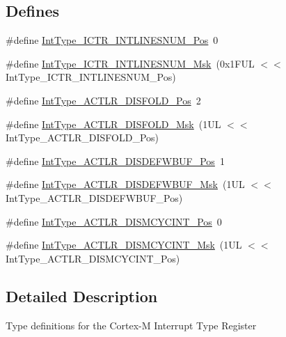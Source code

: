 \subsection*{\-Defines}
\begin{DoxyCompactItemize}
\item 
\#define \hyperlink{group___c_m_s_i_s___interrupt_type_gac80eaf3ce321fd9fb771e0fe260468a5}{\-Int\-Type\-\_\-\-I\-C\-T\-R\-\_\-\-I\-N\-T\-L\-I\-N\-E\-S\-N\-U\-M\-\_\-\-Pos}~0
\item 
\#define \hyperlink{group___c_m_s_i_s___interrupt_type_gaaf30c82ebbf75953fd79f7f4d3696de5}{\-Int\-Type\-\_\-\-I\-C\-T\-R\-\_\-\-I\-N\-T\-L\-I\-N\-E\-S\-N\-U\-M\-\_\-\-Msk}~(0x1\-F\-U\-L $<$$<$ Int\-Type\-\_\-\-I\-C\-T\-R\-\_\-\-I\-N\-T\-L\-I\-N\-E\-S\-N\-U\-M\-\_\-\-Pos)
\item 
\#define \hyperlink{group___c_m_s_i_s___interrupt_type_ga61853c19f3d459914636a4759a1f5306}{\-Int\-Type\-\_\-\-A\-C\-T\-L\-R\-\_\-\-D\-I\-S\-F\-O\-L\-D\-\_\-\-Pos}~2
\item 
\#define \hyperlink{group___c_m_s_i_s___interrupt_type_ga3bb958e0f68490877855c70e62d8e702}{\-Int\-Type\-\_\-\-A\-C\-T\-L\-R\-\_\-\-D\-I\-S\-F\-O\-L\-D\-\_\-\-Msk}~(1\-U\-L $<$$<$ Int\-Type\-\_\-\-A\-C\-T\-L\-R\-\_\-\-D\-I\-S\-F\-O\-L\-D\-\_\-\-Pos)
\item 
\#define \hyperlink{group___c_m_s_i_s___interrupt_type_ga90ae62a7e3054888c8e7d1afefe460db}{\-Int\-Type\-\_\-\-A\-C\-T\-L\-R\-\_\-\-D\-I\-S\-D\-E\-F\-W\-B\-U\-F\-\_\-\-Pos}~1
\item 
\#define \hyperlink{group___c_m_s_i_s___interrupt_type_gac0561eea2ad495bc26e4e20f5dce4661}{\-Int\-Type\-\_\-\-A\-C\-T\-L\-R\-\_\-\-D\-I\-S\-D\-E\-F\-W\-B\-U\-F\-\_\-\-Msk}~(1\-U\-L $<$$<$ Int\-Type\-\_\-\-A\-C\-T\-L\-R\-\_\-\-D\-I\-S\-D\-E\-F\-W\-B\-U\-F\-\_\-\-Pos)
\item 
\#define \hyperlink{group___c_m_s_i_s___interrupt_type_ga9bd2979a493e068877d01e2b0e738095}{\-Int\-Type\-\_\-\-A\-C\-T\-L\-R\-\_\-\-D\-I\-S\-M\-C\-Y\-C\-I\-N\-T\-\_\-\-Pos}~0
\item 
\#define \hyperlink{group___c_m_s_i_s___interrupt_type_ga40ea4dcfac1858ccc29b7c628658e0b8}{\-Int\-Type\-\_\-\-A\-C\-T\-L\-R\-\_\-\-D\-I\-S\-M\-C\-Y\-C\-I\-N\-T\-\_\-\-Msk}~(1\-U\-L $<$$<$ Int\-Type\-\_\-\-A\-C\-T\-L\-R\-\_\-\-D\-I\-S\-M\-C\-Y\-C\-I\-N\-T\-\_\-\-Pos)
\end{DoxyCompactItemize}


\subsection{\-Detailed \-Description}
\-Type definitions for the \-Cortex-\/\-M \-Interrupt \-Type \-Register 

